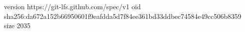 version https://git-lfs.github.com/spec/v1
oid sha256:da672a152b66950601f9eafdda5d7f84ee361bd33ddbec74584e49cc506b8359
size 2035
